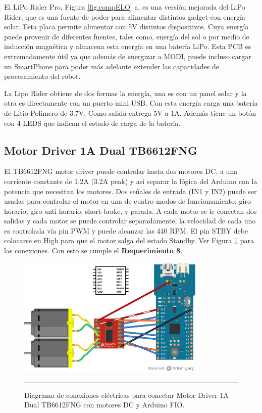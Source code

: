 El LiPo Rider Pro, Figura \ref{fig:compELO} a, es una versión mejorada del LiPo Rider, que es una fuente de poder para alimentar distintos gadget con energía solar. Esta placa permite alimentar con 5V distintos dispositivos. Cuya energía puede provenir de diferentes fuentes, tales como, energía del sol o por medio de inducción magnética y almacena esta energía en una batería LiPo. Esta PCB es extremadamente útil ya que además de energizar a MODI, puede incluso cargar un SmartPhone para poder más adelante extender las capacidades de procesamiento del robot.

La Lipo Rider obtiene de dos formas la energía, una es con un panel solar y la otra es directamente con un puerto mini USB. Con esta energía carga una batería de Litio Polímero de 3.7V. Como salida entrega 5V a 1A. Además tiene un botón con 4 LEDS que indican el estado de carga de la batería.

\subsection{Motor Driver 1A Dual TB6612FNG}
El TB6612FNG motor driver puede controlar hasta dos motores DC, a una corriente constante de 1.2A (3.2A peak) y así separar la lógica del Arduino con la potencia que necesitan los motores. Dos señales de entrada (IN1 y IN2) puede ser usadas para controlar el motor en una de cuatro modos de funcionamiento: giro horario, giro anti horario, short-brake, y parada. A cada motor se le conectan dos salidas y cada motor se puede controlar separadamente, la velocidad de cada uno es controlada vía pin PWM y puede alcanzar las 440 RPM. El pin STBY debe colocarse en High para que el motor salga del estado Standby. Ver Figura  \ref{fig:TB6612FNG} para las conexiones. Con esto se cumple el \textbf{Requerimiento 8}.

\begin{figure}[htbp]
	\centering
		\includegraphics[width=0.8\textwidth]{./Figures/MODI/MODI_without_LED_bb.png}
		\rule{35em}{0.5pt}
	\caption[Conexión eléctrica Motor Driver 1A Dual TB6612FNG]{Diagrama de conexiones eléctricas para conectar Motor Driver 1A Dual TB6612FNG con motores DC y Arduino FIO.}
	\label{fig:TB6612FNG}
\end{figure}

